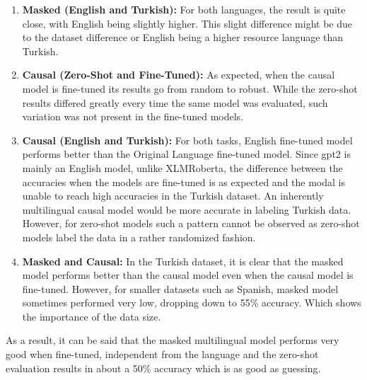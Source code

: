 \documentclass[
]{ceurart}
\begin{document}
\begin{enumerate}
    \item \textbf{Masked (English and Turkish):} For both languages, the result is quite close, with English being slightly higher. This slight difference might be due to the dataset difference or English being a higher resource language than Turkish. 
    \item \textbf{Causal (Zero-Shot and Fine-Tuned):} As expected, when the causal model is fine-tuned its results go from random to robust. While the zero-shot results differed greatly every time the same model was evaluated, such variation was not present in the fine-tuned models.
    \item \textbf{Causal (English and Turkish):} For both tasks, English fine-tuned model performs better than the Original Language fine-tuned model. Since gpt2 is mainly an English model, unlike XLMRoberta, the difference between the accuracies when the models are fine-tuned is as expected and the modal is unable to reach high accuracies in the Turkish dataset. An inherently multilingual causal model would be more accurate in labeling Turkish data. However, for zero-shot models such a pattern cannot be observed as zero-shot models label the data in a rather randomized fashion.
    \item \textbf{Masked and Causal:} In the Turkish dataset, it is clear that the masked model performs better than the causal model even when the causal model is fine-tuned. However, for smaller datasets such as Spanish, masked model sometimes performed very low, dropping down to 55\% accuracy. Which shows the importance of the data size.
\end{enumerate}

As a result, it can be said that the masked multilingual model performs very good when fine-tuned, independent from the language and the zero-shot evaluation results in about a 50\% accuracy which is as good as guessing.
\end{document}

